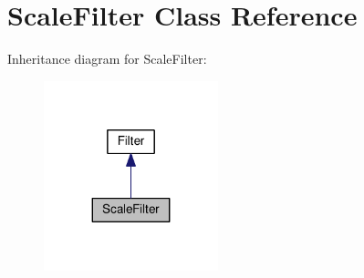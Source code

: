 \hypertarget{classModel_1_1ScaleFilter}{}\section{Scale\+Filter Class Reference}
\label{classModel_1_1ScaleFilter}


Inheritance diagram for Scale\+Filter\+:
\nopagebreak
\begin{figure}[H]
\begin{center}
\leavevmode
\includegraphics[width=143pt]{classModel_1_1ScaleFilter__inherit__graph}
\end{center}
\end{figure}
